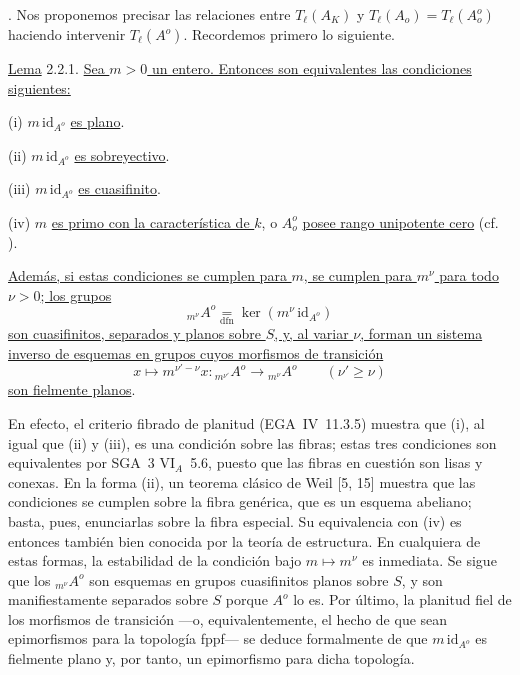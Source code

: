 \par\medskip
{}. Nos proponemos precisar las relaciones entre $T_\ell(A_K)$ y
$T_\ell(A_o)=T_\ell(A_o^o)$ haciendo intervenir $T_\ell(A^o)$.
Recordemos primero lo siguiente.

\medskip
\noindent
\underline{Lema} 2.2.1. \underline{Sea $m>0$ un entero. Entonces son
equivalentes las condiciones siguientes:}

\smallskip
\noindent
(i) $m\,\mathrm{id}_{A^o}$ \underline{es plano}.

\noindent
(ii) $m\,\mathrm{id}_{A^o}$ \underline{es sobreyectivo}.

\noindent
(iii) $m\,\mathrm{id}_{A^o}$ \underline{es cuasifinito}.

\noindent
(iv) $m$ \underline{es primo con la característica de $k$}, o $A_o^o$
\underline{posee rango unipotente cero} (cf.
).

\smallskip
\noindent
\underline{Además, si estas condiciones se cumplen para $m$, se
cumplen para $m^\nu$ para todo $\nu>0$; los grupos}
\[
 {}_{m^\nu}A^o\underset{\mathrm{dfn}}{=}
 \ker(m^\nu\,\mathrm{id}_{A^o})
\]
\underline{son cuasifinitos, separados y planos sobre $S$, y, al variar
$\nu$, forman un sistema inverso de esquemas en grupos cuyos morfismos
de transición}
\[
 x\longmapsto m^{\nu'-\nu}x:
 {}_{m^{\nu'}}A^o\longrightarrow{}_{m^\nu}A^o
 \qquad(\nu'\geq\nu)
\]
\underline{son fielmente planos}.

En efecto, el criterio fibrado de planitud (EGA~IV~11.3.5) muestra que
(i), al igual que (ii) y (iii), es una condición sobre las fibras;
estas tres condiciones son equivalentes por SGA~3
$\mathrm{VI}_A$~5.6, puesto que las fibras en cuestión son lisas y
conexas. En la forma (ii), un teorema clásico de Weil [5, 15] muestra
que las condiciones se cumplen sobre la fibra genérica, que es un
esquema abeliano; basta, pues, enunciarlas sobre la fibra especial. Su
equivalencia con (iv) es entonces también bien conocida por la teoría
de estructura. En cualquiera de estas formas, la estabilidad de la
condición bajo $m\mapsto m^\nu$ es inmediata. Se sigue que los
${}_{m^\nu}A^o$ son esquemas en grupos cuasifinitos planos sobre $S$,
y son manifiestamente separados sobre $S$ porque $A^o$ lo es. Por
último, la planitud fiel de los morfismos de transición ---o,
equivalentemente, el hecho de que sean epimorfismos para la topología
fppf--- se deduce formalmente de que $m\,\mathrm{id}_{A^o}$ es
fielmente plano y, por tanto, un epimorfismo para dicha topología.


